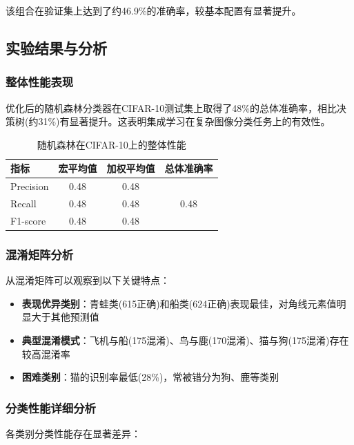 \documentclass[UTF8]{report}
\theoremstyle{MyLineTheoremStyle} %
\theoremstyle{MyBlockTheoremStyle} %
\theoremstyle{MySubsubsectionStyle} %
\begin{document}
该组合在验证集上达到了约46.9\%的准确率，较基本配置有显著提升。

\subsection{实验结果与分析}

\subsubsection{整体性能表现}
优化后的随机森林分类器在CIFAR-10测试集上取得了48\%的总体准确率，相比决策树(约31\%)有显著提升。这表明集成学习在复杂图像分类任务上的有效性。

\begin{table}[h]
\centering
\caption{随机森林在CIFAR-10上的整体性能}
\begin{tabular}{l c c c}
\toprule
\textbf{指标} & \textbf{宏平均值} & \textbf{加权平均值} & \textbf{总体准确率} \\
\midrule
Precision & 0.48 & 0.48 & \multirow{3}{*}{0.48} \\
Recall & 0.48 & 0.48 & \\
F1-score & 0.48 & 0.48 & \\
\bottomrule
\end{tabular}
\end{table}

\subsubsection{混淆矩阵分析}
从混淆矩阵可以观察到以下关键特点：
\begin{itemize}
    \item \textbf{表现优异类别}：青蛙类(615正确)和船类(624正确)表现最佳，对角线元素值明显大于其他预测值
    \item \textbf{典型混淆模式}：飞机与船(175混淆)、鸟与鹿(170混淆)、猫与狗(175混淆)存在较高混淆率
    \item \textbf{困难类别}：猫的识别率最低(28\%)，常被错分为狗、鹿等类别
\end{itemize}

\subsubsection{分类性能详细分析}
各类别分类性能存在显著差异：
\end{document}
